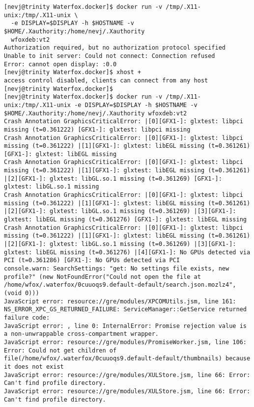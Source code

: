 \documentclass{article}  %
\begin{document}
\begin{verbatim}
[nevj@trinity Waterfox.docker]$ docker run -v /tmp/.X11-unix:/tmp/.X11-unix \
  -e DISPLAY=$DISPLAY -h $HOSTNAME -v $HOME/.Xauthority:/home/nevj/.Xauthority 
  wfoxdeb:vt2
Authorization required, but no authorization protocol specified
Unable to init server: Could not connect: Connection refused
Error: cannot open display: :0.0
[nevj@trinity Waterfox.docker]$ xhost +
access control disabled, clients can connect from any host
[nevj@trinity Waterfox.docker]$ 
[nevj@trinity Waterfox.docker]$ docker run -v /tmp/.X11-unix:/tmp/.X11-unix -e DISPLAY=$DISPLAY -h $HOSTNAME -v $HOME/.Xauthority:/home/nevj/.Xauthority wfoxdeb:vt2
Crash Annotation GraphicsCriticalError: |[0][GFX1-]: glxtest: libpci missing (t=0.361222) [GFX1-]: glxtest: libpci missing
Crash Annotation GraphicsCriticalError: |[0][GFX1-]: glxtest: libpci missing (t=0.361222) |[1][GFX1-]: glxtest: libEGL missing (t=0.361261) [GFX1-]: glxtest: libEGL missing
Crash Annotation GraphicsCriticalError: |[0][GFX1-]: glxtest: libpci missing (t=0.361222) |[1][GFX1-]: glxtest: libEGL missing (t=0.361261) |[2][GFX1-]: glxtest: libGL.so.1 missing (t=0.361269) [GFX1-]: glxtest: libGL.so.1 missing
Crash Annotation GraphicsCriticalError: |[0][GFX1-]: glxtest: libpci missing (t=0.361222) |[1][GFX1-]: glxtest: libEGL missing (t=0.361261) |[2][GFX1-]: glxtest: libGL.so.1 missing (t=0.361269) |[3][GFX1-]: glxtest: libEGL missing (t=0.361276) [GFX1-]: glxtest: libEGL missing
Crash Annotation GraphicsCriticalError: |[0][GFX1-]: glxtest: libpci missing (t=0.361222) |[1][GFX1-]: glxtest: libEGL missing (t=0.361261) |[2][GFX1-]: glxtest: libGL.so.1 missing (t=0.361269) |[3][GFX1-]: glxtest: libEGL missing (t=0.361276) |[4][GFX1-]: No GPUs detected via PCI (t=0.361286) [GFX1-]: No GPUs detected via PCI
console.warn: SearchSettings: "get: No settings file exists, new profile?" (new NotFoundError("Could not open the file at /home/wfox/.waterfox/0cuuoqs9.default-default/search.json.mozlz4", (void 0)))
JavaScript error: resource://gre/modules/XPCOMUtils.jsm, line 161: NS_ERROR_XPC_GS_RETURNED_FAILURE: ServiceManager::GetService returned failure code:
JavaScript error: , line 0: InternalError: Promise rejection value is a non-unwrappable cross-compartment wrapper.
JavaScript error: resource://gre/modules/PromiseWorker.jsm, line 106: Error: Could not get children of file(/home/wfox/.waterfox/0cuuoqs9.default-default/thumbnails) because it does not exist
JavaScript error: resource://gre/modules/XULStore.jsm, line 66: Error: Can't find profile directory.
JavaScript error: resource://gre/modules/XULStore.jsm, line 66: Error: Can't find profile directory.

\end{verbatim}
\end{document}
